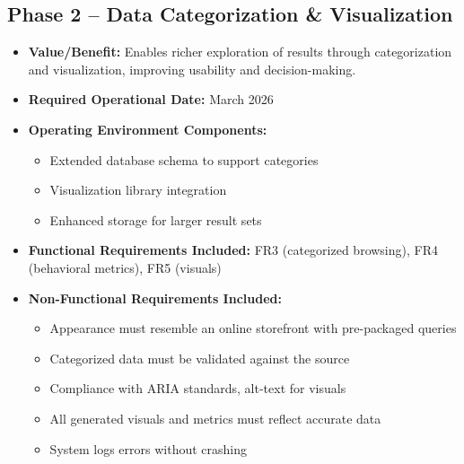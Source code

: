\documentclass[12pt]{article}
\begin{document}
\subsection*{Phase 2 -- Data Categorization \& Visualization}
\begin{itemize}
    \item \textbf{Value/Benefit:} Enables richer exploration of results through categorization and visualization, improving usability and decision-making.
    \item \textbf{Required Operational Date:} March 2026
    \item \textbf{Operating Environment Components:}
    \begin{itemize}
        \item Extended database schema to support categories
        \item Visualization library integration
        \item Enhanced storage for larger result sets
    \end{itemize}
    \item \textbf{Functional Requirements Included:} FR3 (categorized browsing), FR4 (behavioral metrics), FR5 (visuals)
    \item \textbf{Non-Functional Requirements Included:}
    \begin{itemize}
        \item Appearance must resemble an online storefront with pre-packaged queries
        \item Categorized data must be validated against the source
        \item Compliance with ARIA standards, alt-text for visuals
        \item All generated visuals and metrics must reflect accurate data
        \item System logs errors without crashing
    \end{itemize}
\end{itemize}
\end{document}

